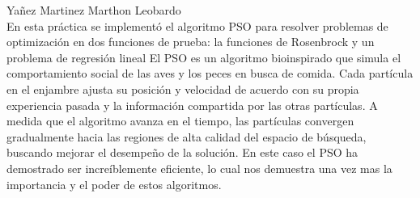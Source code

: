 \documentclass{report}
\begin{document}
    Yañez Martinez Marthon Leobardo\\
    En esta práctica se implementó el algoritmo PSO para resolver problemas de optimización en dos funciones de prueba: la funciones de Rosenbrock y un problema de regresión lineal
    El PSO es un algoritmo bioinspirado que simula el comportamiento social de las aves
    y los peces en busca de comida. Cada partícula en el enjambre ajusta su posición y velocidad de acuerdo con su propia experiencia pasada y la información compartida por las otras partículas. A medida que el algoritmo avanza en el tiempo, las partículas convergen gradualmente hacia las regiones de alta calidad del espacio de búsqueda, buscando mejorar el desempeño de la solución.
    En este caso el PSO ha demostrado ser increíblemente eficiente, lo cual nos demuestra una vez mas la importancia y el poder de estos algoritmos.
\end{document}

